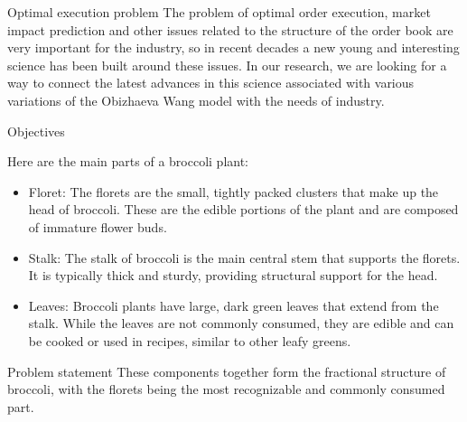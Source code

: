 \documentclass[]{beamer}
\begin{document}
\begin{frame}[t]
\begin{columns}[t]
\begin{column}{\onecolwid}
\begin{block}{Optimal execution problem}
        The problem of optimal order execution, market impact prediction and other issues related to the structure of the order book are very important for the industry, 
        so in recent decades a new young and interesting science has been built around these issues. In our research, we are looking for a way 
        to connect the latest advances in this science associated with various variations of the Obizhaeva Wang model with the needs of industry.
    
    \end{block}
    
    
    
    \begin{alertblock}{Objectives}
    
    Here are the main parts of a broccoli plant:
    \begin{itemize}
        \item Floret: The florets are the small, tightly packed clusters that make up the head of broccoli. These are the edible portions of the plant and are composed of immature flower buds.

    	\item Stalk: The stalk of broccoli is the main central stem that supports the florets. It is typically thick and sturdy, providing structural support for the head.

    	\item Leaves: Broccoli plants have large, dark green leaves that extend from the stalk. While the leaves are not commonly consumed, they are edible and can be cooked or used in recipes, similar to other leafy greens.

    \end{itemize}
    
    \end{alertblock}
    
    \begin{block}{Problem statement}
    These components together form the fractional structure of broccoli, with the florets being the most recognizable and commonly consumed part.
    \end{block}
    
    

\end{column}
\end{columns}
\end{frame}
\end{document}
